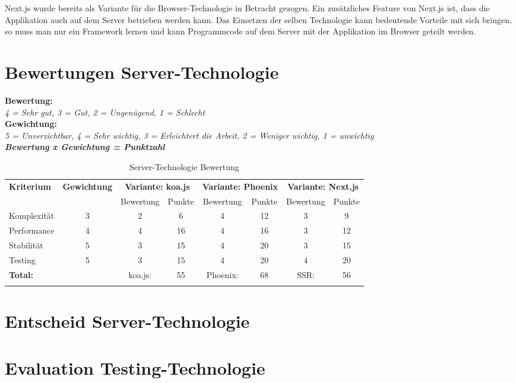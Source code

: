 Next.js wurde bereits als Variante für die Browser-Technologie in Betracht
gezogen. Ein zusätzliches Feature von Next.js ist, dass die Applikation auch
auf dem Server betrieben werden kann.
Das Einsetzen der selben Technologie kann bedeutende Vorteile mit sich bringen,
so muss man nur ein Framework lernen und kann Programmcode auf dem Server mit
der Applikation im Browser geteilt werden.

\clearpage
\section{Bewertungen Server-Technologie}\label{bewertungen-server-technologie}

\textbf{Bewertung:}\\
\textit{4 = Sehr gut, 3 = Gut, 2 = Ungenügend, 1 = Schlecht}\\
\textbf{Gewichtung:}\\
\textit{5 = Unverzichtbar, 4 = Sehr wichtig, 3 = Erleichtert die Arbeit, 2 = Weniger wichtig, 1 = unwichtig}\\

\textbf{\textit{Bewertung x Gewichtung = Punktzahl}}

\begin{longtable}[]{@{}p{2cm}ccccccc@{}}
  \toprule
  \textbf{Kriterium} & \textbf{Gewichtung} & \multicolumn{2}{c}{\textbf{Variante: koa.js}} & \multicolumn{2}{c}{\textbf{Variante: Phoenix}} & \multicolumn{2}{c}{\textbf{Variante: Next.js}}\tabularnewline
  & & Bewertung & Punkte & Bewertung & Punkte & Bewertung & Punkte \tabularnewline
  \midrule
  \endhead
  Komplexität & 3 & 2 & 6 & 4 & 12 & 3 & 9 \tabularnewline
  Performance & 4 & 4 & 16 & 4 & 16 & 3 & 12 \tabularnewline
  Stabilität & 5 & 3 & 15 & 4 & 20 & 3 & 15 \tabularnewline
  Testing & 5 & 3 & 15 & 4 & 20 & 4 & 20 \tabularnewline
  \midrule
  \textbf{Total:} & & koa.js: & 55 & Phoenix: & 68 & SSR: & 56 \tabularnewline
  \bottomrule
  \caption{Server-Technologie Bewertung}
\end{longtable}

\section{Entscheid Server-Technologie}\label{entscheid-server-technologie}

\clearpage
\section{Evaluation Testing-Technologie}\label{evaluation-testing-technologie}

